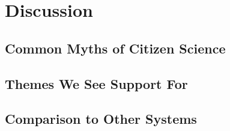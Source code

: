 \documentclass{sigchi}
\begin{document}
\section{Discussion}

\subsection{Common Myths of Citizen Science}

\subsection{Themes We See Support For}

\subsection{Comparison to Other Systems}
\end{document}
